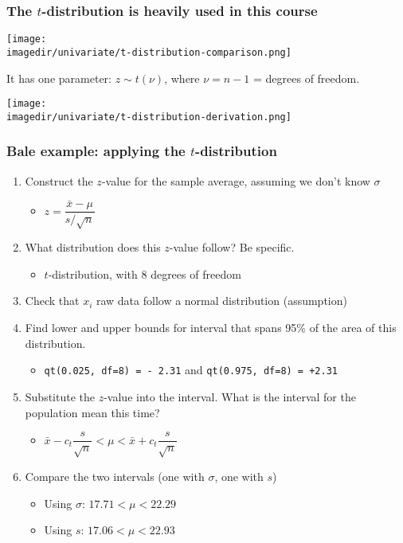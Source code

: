 \begin{frame}\frametitle{The $t$-distribution is heavily used in this course}
	\begin{center}
		\texttt{[image: \\imagedir/univariate/t-distribution-comparison.png]}
	\end{center}
	It has one parameter: $z \sim t\left(\nu\right)$, where $\nu = n-1$ = degrees of freedom.
	\begin{center}
		\texttt{[image: \\imagedir/univariate/t-distribution-derivation.png]}
	\end{center}
\end{frame}

\begin{frame}\frametitle{Bale example: applying the $t$-distribution}
	\begin{enumerate}
		\item	Construct the $z$-value for the sample average, assuming we don't know $\sigma$
		\begin{itemize}
			\item	$z = \dfrac{\bar{x} - \mu}{s/\sqrt{n}}$
		\end{itemize}
		\item	What distribution does this $z$-value follow? Be specific.
		\begin{itemize}
			\item	$t$-distribution, with 8 degrees of freedom
		\end{itemize}
		\item	Check that $x_i$ raw data follow a normal distribution (assumption)
		\item	Find lower and upper bounds for interval that spans 95\% of the area of this distribution.
		\begin{itemize}
			\item	\texttt{qt(0.025, df=8) = - 2.31} and \texttt{qt(0.975, df=8) = +2.31}
		\end{itemize}
		\item	Substitute the $z$-value into the interval. What is the interval for the population mean this time?
		\begin{itemize}
			\item	$\bar{x} - c_t\dfrac{s}{\sqrt{n}} < \mu < \bar{x} + c_t\dfrac{s}{\sqrt{n}}$
		\end{itemize}
		\item	Compare the two intervals (one with $\sigma$, one with $s$)
		\begin{itemize}
			\item	Using $\sigma$: $17.71 < \mu < 22.29$
			\item	Using $s$: $17.06 < \mu < 22.93$
		\end{itemize}
	\end{enumerate}
\end{frame}

